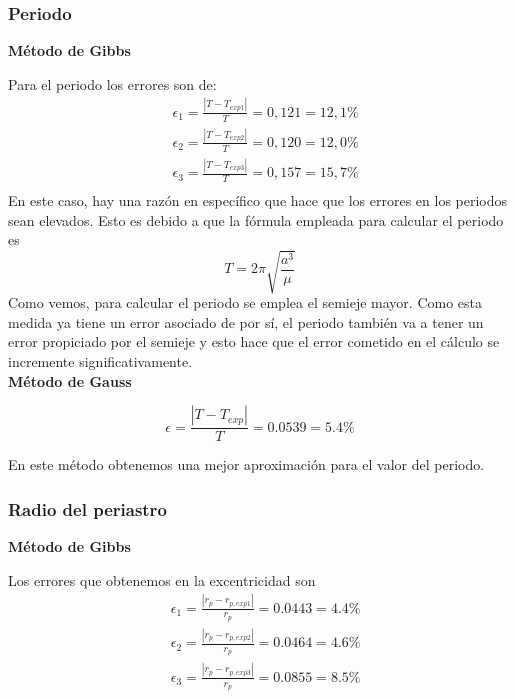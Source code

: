 \documentclass{article}
\numberwithin{equation}{section}
\begin{document}
\subsubsection{Periodo}
\noindent\textbf{Método de Gibbs}\par
Para el periodo los errores son de:
\begin{align*}
    &\epsilon_{1}=\frac{\left\lvert T-T_{exp1} \right\rvert }{T}=0,121=12,1\% \\
    &\epsilon_{2}=\frac{\left\lvert T-T_{exp2} \right\rvert }{T}=0,120=12,0\% \\
    &\epsilon_{3}=\frac{\left\lvert T-T_{exp3} \right\rvert }{T}=0,157=15,7\% \\
\end{align*}
En este caso, hay una razón en específico que hace que los 
errores en los periodos sean elevados. Esto es debido a que 
la fórmula empleada para calcular el periodo es 
\begin{equation*}
    T=2\pi\sqrt{\frac{a^{3}}{\mu}}
\end{equation*}
Como vemos, para calcular el periodo se emplea el semieje mayor. 
Como esta medida ya tiene un error asociado de por sí, el 
periodo también va a tener un error propiciado por el 
semieje y esto hace que el error cometido en el cálculo 
se incremente significativamente.\\

\noindent\textbf{Método de Gauss}\par

\begin{equation*}
    \epsilon=\frac{\left\lvert T-T_{exp} \right\rvert}{T}=0.0539=5.4\%
\end{equation*}

En este método obtenemos una mejor aproximación para el valor del periodo.

\subsubsection{Radio del periastro}
\noindent\textbf{Método de Gibbs}\par
Los errores que obtenemos en la excentricidad son 
\begin{align*}
    &\epsilon_{1}=\frac{\left\lvert r_p-r_{p,exp1} \right\rvert }{r_p}=0.0443=4.4\% \\
    &\epsilon_{2}=\frac{\left\lvert r_p-r_{p,exp2} \right\rvert }{r_p}=0.0464=4.6\% \\
    &\epsilon_{3}=\frac{\left\lvert r_p-r_{p,exp3} \right\rvert }{r_p}=0.0855=8.5\% \\
\end{align*}
\end{document}
